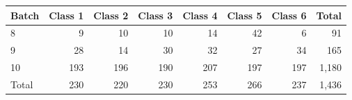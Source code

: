 \begin{tabular}{lrrrrrrr}
\toprule
Batch & Class 1 & Class 2 & Class 3 & Class 4 & Class 5 & Class 6 & Total \\
\midrule
8 & 9 & 10 & 10 & 14 & 42 & 6 & 91 \\
9 & 28 & 14 & 30 & 32 & 27 & 34 & 165 \\
10 & 193 & 196 & 190 & 207 & 197 & 197 & 1,180 \\
\midrule
Total & 230 & 220 & 230 & 253 & 266 & 237 & 1,436 \\
\bottomrule
\end{tabular}
